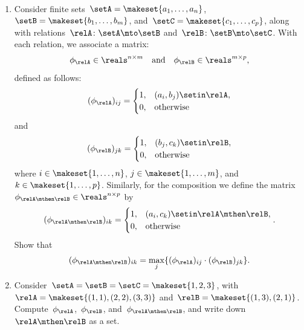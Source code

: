 \begin{gradedexercise}
    \label{ex:ComposingFiniteRelations}
    \
    \begin{enumerate}
        \item Consider finite sets~$\setA = \makeset{a_1, \dots, a_n}$,~$\setB = \makeset{b_1, \dots, b_m}$, and~$\setC = \makeset{c_1, \dots, c_p}$, along with relations~$\relA \colon \setA \mto \setB$ and~$\relB \colon \setB \mto \setC$.
              With each relation, we associate a matrix:
              \[
                  \phi_{\relA} \in \reals^{n \times m} \quad \text{and} \quad \phi_{\relB} \in \reals^{m \times p},
              \]
              defined as follows:
              \[
                  (\phi_{\relA})_{ij} = \begin{cases}
                      1, & (a_i, b_j) \setin \relA, \\
                      0, & \text{otherwise}
                  \end{cases}
              \]
              and
              \[
                  (\phi_{\relB})_{jk} = \begin{cases}
                      1, & (b_j, c_k) \setin \relB, \\
                      0, & \text{otherwise}
                  \end{cases}
              \]
              where \( i \in \makeset{1, \dots, n} \), \( j \in \makeset{1, \dots, m} \), and \( k \in \makeset{1, \dots, p} \).
              Similarly, for the composition we define the matrix~$\phi_{\relA \mthen \relB} \in \reals^{n \times p}$ by
              \[
                  (\phi_{\relA \mthen \relB})_{ik} = \begin{cases}
                      1, & (a_i, c_k) \setin \relA \mthen \relB, \\
                      0, & \text{otherwise}
                  \end{cases}.
              \]
              Show that
              \[
                  (\phi_{\relA \mthen \relB})_{ik} = \max_{j} \{ (\phi_{\relA})_{ij} \cdot (\phi_{\relB})_{jk} \}.
              \]

        \item Consider~$\setA = \setB = \setC = \makeset{1, 2, 3}$, with~$\relA = \makeset{(1,1), (2,2), (3,3)}$ and~$\relB = \makeset{(1,3), (2,1)}$.
              Compute~$\phi_{\relA}$,~$\phi_{\relB}$, and~$\phi_{\relA \mthen \relB}$, and write down~$\relA \mthen \relB$ as a set.
    \end{enumerate}
\end{gradedexercise}

